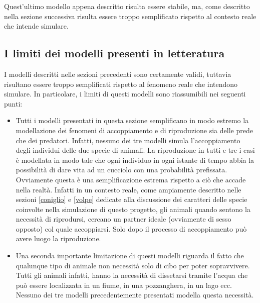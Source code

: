 \documentclass[11pt]{article}
\begin{document}
Quest'ultimo modello appena descritto risulta essere stabile, ma, come descritto nella sezione successiva risulta essere troppo semplificato rispetto al contesto reale che intende simulare. 

\subsection{I limiti dei modelli presenti in letteratura}
I modelli descritti nelle sezioni precedenti sono certamente validi, tuttavia risultano essere troppo semplificati rispetto al fenomeno reale che intendono simulare. 
In particolare, i limiti di questi modelli sono riassumibili nei seguenti punti:
\begin{itemize}
    \item Tutti i modelli presentati in questa sezione semplificano in modo estremo la modellazione dei fenomeni di accoppiamento e di riproduzione sia delle prede che dei predatori. Infatti, nessuno dei tre modelli simula l'accoppiamento degli individui delle due specie di animali. La riproduzione in tutti e tre i casi è modellata in modo tale che ogni individuo in ogni istante di tempo abbia la possibilità di dare vita ad un cucciolo con una probabilità prefissata. Ovviamente questa è una semplificazione estrema rispetto a ciò che accade nella realtà. Infatti in un contesto reale, come ampiamente descritto nelle sezioni \ref{coniglio} e \ref{volpe} dedicate alla discussione dei caratteri delle specie coinvolte nella simulazione di questo progetto, gli animali quando sentono la necessità di riprodursi, cercano un partner ideale (ovviamente di sesso opposto) col quale accoppiarsi. Solo dopo il processo di accoppiamento può avere luogo la riproduzione. 
    \item Una seconda importante limitazione di questi modelli riguarda il fatto che qualunque tipo di animale non necessità solo di cibo per poter sopravvivere. Tutti gli animali infatti, hanno la necessità di dissetarsi tramite l'acqua che può essere localizzata in un fiume, in una pozzanghera, in un lago ecc. Nessuno dei tre modelli precedentemente presentati modella questa necessità. 

\end{itemize}
\end{document}
